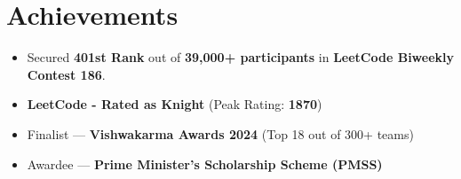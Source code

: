 \documentclass[12pt]{article}
\newcommand{\resumeItem}[1]{\item\small #1}
\newcommand{\resumeSection}[1]{
\section*{#1}
}
\begin{document}
\resumeSection{Achievements}

\begin{itemize}
\resumeItem{Secured \textbf{401st Rank} out of \textbf{39,000+ participants} in \textbf{LeetCode Biweekly Contest 186}.}
\resumeItem{\textbf{LeetCode - Rated as Knight} (Peak Rating: \textbf{1870})}

\resumeItem{Finalist --- \textbf{Vishwakarma Awards 2024} (Top 18 out of 300+ teams)}
\resumeItem{Awardee --- \textbf{Prime Minister's Scholarship Scheme (PMSS)}}
\end{itemize}
\end{document}
